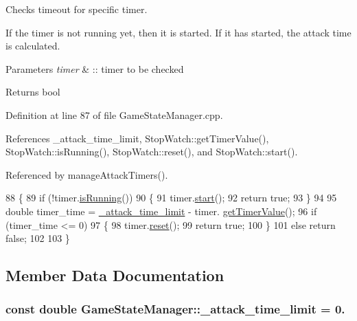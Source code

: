 Checks timeout for specific timer. 

If the timer is not running yet, then it is started. If it has started, the attack time is calculated. 
\begin{DoxyParams}{Parameters}
{\em timer} & \-:\-: timer to be checked \\
\hline
\end{DoxyParams}
\begin{DoxyReturn}{Returns}
bool 
\end{DoxyReturn}


Definition at line 87 of file Game\-State\-Manager.\-cpp.



References \-\_\-attack\-\_\-time\-\_\-limit, Stop\-Watch\-::get\-Timer\-Value(), Stop\-Watch\-::is\-Running(), Stop\-Watch\-::reset(), and Stop\-Watch\-::start().



Referenced by manage\-Attack\-Timers().


\begin{DoxyCode}
88 \{
89     \textcolor{keywordflow}{if} (!timer.\hyperlink{classStopWatch_a4358045d32002cb83ec62d1ebb9fb5ca}{isRunning}())
90     \{
91         timer.\hyperlink{classStopWatch_a09a3c8f9ab03d7b28e4f8b90a833974e}{start}();
92         \textcolor{keywordflow}{return} \textcolor{keyword}{true};
93     \}
94 
95     \textcolor{keywordtype}{double} timer\_time = \hyperlink{classGameStateManager_a94f553200fdb06e224376f60c0bcec4f}{\_attack\_time\_limit} - timer.
      \hyperlink{classStopWatch_a29945e425c084bb7df859c4c10cbd9fe}{getTimerValue}();
96     \textcolor{keywordflow}{if} (timer\_time <= 0)
97     \{
98         timer.\hyperlink{classStopWatch_a1c0dcc57c615559f24bc9f8759271a9d}{reset}();
99         \textcolor{keywordflow}{return} \textcolor{keyword}{true};
100     \}
101     \textcolor{keywordflow}{else} \textcolor{keywordflow}{return} \textcolor{keyword}{false};
102 
103 \}
\end{DoxyCode}


\subsection{Member Data Documentation}
\hypertarget{classGameStateManager_a94f553200fdb06e224376f60c0bcec4f}{
\subsubsection[{\-\_\-attack\-\_\-time\-\_\-limit}]{\setlength{\rightskip}{0pt plus 5cm}const double Game\-State\-Manager\-::\-\_\-attack\-\_\-time\-\_\-limit = 0.\hspace{0.3cm}{\ttfamily [private]}}}\label{classGameStateManager_a94f553200fdb06e224376f60c0bcec4f}


